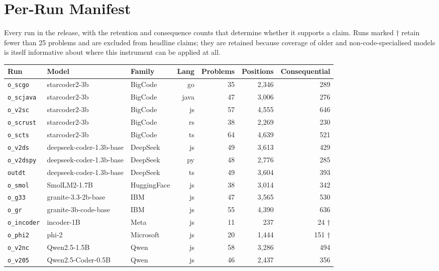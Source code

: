\appendix

\section{Per-Run Manifest}
\label{app:manifest}

Every run in the release, with the retention and consequence counts that determine whether it
supports a claim. Runs marked $\dagger$ retain fewer than 25 problems and are excluded from headline
claims; they are retained because coverage of older and non-code-specialised models is itself
informative about where this instrument can be applied at all.

\begin{table}[H]
\centering\footnotesize
\begin{tabular}{lllrrrr}
\toprule
Run & Model & Family & Lang & Problems & Positions & Consequential \\
\midrule
\texttt{o\_scgo} & starcoder2-3b & BigCode & go & 35 & 2,346 & 289 \\
\texttt{o\_scjava} & starcoder2-3b & BigCode & java & 47 & 3,006 & 276 \\
\texttt{o\_v2sc} & starcoder2-3b & BigCode & js & 57 & 4,555 & 646 \\
\texttt{o\_scrust} & starcoder2-3b & BigCode & rs & 38 & 2,269 & 230 \\
\texttt{o\_scts} & starcoder2-3b & BigCode & ts & 64 & 4,639 & 521 \\
\texttt{o\_v2ds} & deepseek-coder-1.3b-base & DeepSeek & js & 49 & 3,613 & 429 \\
\texttt{o\_v2dspy} & deepseek-coder-1.3b-base & DeepSeek & py & 48 & 2,776 & 285 \\
\texttt{outdt} & deepseek-coder-1.3b-base & DeepSeek & ts & 49 & 3,604 & 393 \\
\texttt{o\_smol} & SmolLM2-1.7B & HuggingFace & js & 38 & 3,014 & 342 \\
\texttt{o\_g33} & granite-3.3-2b-base & IBM & js & 47 & 3,565 & 530 \\
\texttt{o\_gr} & granite-3b-code-base & IBM & js & 55 & 4,390 & 636 \\
\texttt{o\_incoder} & incoder-1B & Meta & js & 11 & 237 & 24 $\dagger$ \\
\texttt{o\_phi2} & phi-2 & Microsoft & js & 20 & 1,444 & 151 $\dagger$ \\
\texttt{o\_v2nc} & Qwen2.5-1.5B & Qwen & js & 58 & 3,286 & 494 \\
\texttt{o\_v205} & Qwen2.5-Coder-0.5B & Qwen & js & 46 & 2,437 & 356 \\

\end{tabular}
\end{table}
